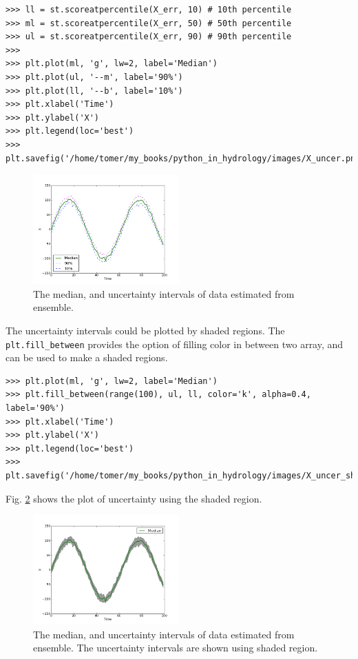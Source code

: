 \documentclass[10pt]{book}
\begin{document}
{\beforeverb \begin{verbatim}
>>> ll = st.scoreatpercentile(X_err, 10) # 10th percentile
>>> ml = st.scoreatpercentile(X_err, 50) # 50th percentile
>>> ul = st.scoreatpercentile(X_err, 90) # 90th percentile
>>> 
>>> plt.plot(ml, 'g', lw=2, label='Median')
>>> plt.plot(ul, '--m', label='90%')
>>> plt.plot(ll, '--b', label='10%')
>>> plt.xlabel('Time')
>>> plt.ylabel('X')
>>> plt.legend(loc='best')
>>> plt.savefig('/home/tomer/my_books/python_in_hydrology/images/X_uncer.png')
\end{verbatim} \afterverb

\beforefig
\begin{figure}[h!]
  \centering
    \includegraphics[width=0.5\textwidth]{images/X_uncer.png}
  \caption{The median, and uncertainty intervals of data estimated from ensemble.}
   \label{fig:X_uncern}
\end{figure}
\afterfig

The uncertainty intervals could be plotted by shaded regions. The \verb"plt.fill_between" provides the option of filling color in between two array, and can be used to make a shaded regions.

\beforeverb \begin{verbatim}
>>> plt.plot(ml, 'g', lw=2, label='Median')
>>> plt.fill_between(range(100), ul, ll, color='k', alpha=0.4, label='90%')
>>> plt.xlabel('Time')
>>> plt.ylabel('X')
>>> plt.legend(loc='best')
>>> plt.savefig('/home/tomer/my_books/python_in_hydrology/images/X_uncer_shade.png')
\end{verbatim} \afterverb
Fig. \ref{fig:X_uncern_shaded} shows the plot of uncertainty using the shaded region.

\beforefig
\begin{figure}[h!]
  \centering
    \includegraphics[width=0.5\textwidth]{images/X_uncer_shade.png}
  \caption{The median, and uncertainty intervals of data estimated from ensemble. The uncertainty intervals are shown using shaded region.}
   \label{fig:X_uncern_shaded}
\end{figure}
\afterfig

}
\end{document}

